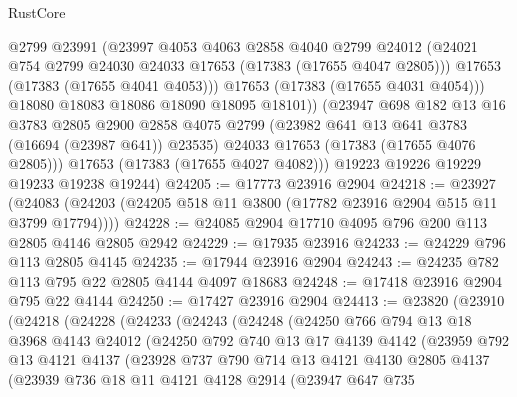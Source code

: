 \begin{lexlean}{RustCore}
\begin{coremodule}
              @2799
              @23991
              (@23997
                @4053
                @4063
                @2858
                @4040
                @2799
                @24012
                (@24021 @754 @2799 @24030 @24033 @17653 (@17383 (@17655 @4047 @2805)))
                @17653
                (@17383 (@17655 @4041 @4053)))
              @17653
              (@17383 (@17655 @4031 @4054)))
            @18080
            @18083
            @18086
            @18090
            @18095
            @18101))
        (@23947
          @698
          @182
          @13
          @16
          @3783
          @2805
          @2900
          @2858
          @4075
          @2799
          (@23982 @641 @13 @641 @3783 (@16694 (@23987 @641)) @23535)
          @24033
          @17653
          (@17383 (@17655 @4076 @2805)))
        @17653
        (@17383 (@17655 @4027 @4082)))
      @19223
      @19226
      @19229
      @19233
      @19238
      @19244)
@24205 := @17773 @23916 @2904
@24218 := @23927
    (@24083 (@24203 (@24205 @518 @11 @3800 (@17782 @23916 @2904 @515 @11 @3799 @17794))))
@24228 := @24085 @2904 @17710 @4095 @796 @200 @113 @2805 @4146 @2805 @2942
@24229 := @17935 @23916
@24233 := @24229 @796 @113 @2805 @4145
@24235 := @17944 @23916 @2904
@24243 := @24235 @782 @113 @795 @22 @2805 @4144 @4097 @18683
@24248 := @17418 @23916 @2904 @795 @22 @4144
@24250 := @17427 @23916 @2904
@24413 := @23820
    (@23910
      (@24218
        (@24228
          (@24233
            (@24243
              (@24248
                (@24250
                  @766
                  @794
                  @13
                  @18
                  @3968
                  @4143
                  @24012
                  (@24250
                    @792
                    @740
                    @13
                    @17
                    @4139
                    @4142
                    (@23959
                      @792
                      @13
                      @4121
                      @4137
                      (@23928
                        @737
                        @790
                        @714
                        @13
                        @4121
                        @4130
                        @2805
                        @4137
                        (@23939
                          @736
                          @18
                          @11
                          @4121
                          @4128
                          @2914
                          (@23947
                            @647
                            @735

\end{coremodule}
\end{lexlean}
